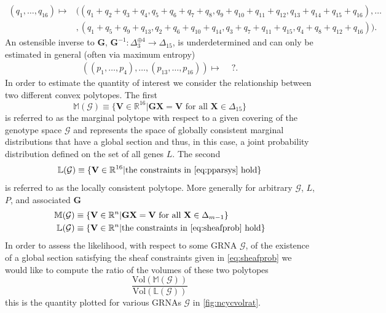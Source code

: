 \begin{align*}
(q_1, \ldots , q_{16}) \mapsto &((q_1+q_2+q_3+q_4, q_5+q_6+q_7+q_8, q_9+q_{10}+q_{11}+q_{12},q_{13}+q_{14}+q_{15}+q_{16}), \ldots \\
&,(q_1 + q_5 + q_9 + q_{13}, q_2 + q_6 + q_{10} + q_{14}, q_3 + q_7 + q_{11} + q_{15}, q_4 + q_8 + q_{12} + q_{16} ) ).
\end{align*}
An ostensible inverse to $\mathbf{G}$, $\mathbf{G}^{-1} \colon \Delta_3^{\oplus 4} \longrightarrow \Delta_{15}$, is underdetermined and can only be estimated in general (often via maximum entropy)
\begin{align*}
((p_1, \ldots , p_4), \ldots, (p_{13},\ldots,p_{16})) \mapsto & \,\,?.
\end{align*}
In order to estimate the quantity of interest we consider the relationship between two different convex polytopes. The first
$$
\mathbb{M}(\mathcal{G}) \equiv \{\mathbf{V} \in \mathbb{R}^{16} | \mathbf{G}\mathbf{X}=\mathbf{V} \text{ for all } \mathbf{X} \in \Delta_{15}\}
$$
is referred to as the marginal polytope with respect to a given covering of the genotype space $\mathcal{G}$ and represents the space of globally consistent marginal distributions that have a global section and thus, in this case, a joint probability distribution defined on the set of all genes $L$. The second
$$
\mathbb{L}(\mathcal{G}) \equiv \{\mathbf{V} \in \mathbb{R}^{16} | \text{the constraints in \ref{eq:pparsys} hold}\}
$$
is referred to as the locally consistent polytope. More generally for arbitrary $\mathcal{G}$, $L$, $P$, and associated $\mathbf{G}$
\begin{equation}
\begin{aligned}\label{eq:polytopes}
\mathbb{M}(\mathcal{G}) &\equiv \{\mathbf{V} \in \mathbb{R}^{n} | \mathbf{G}\mathbf{X}=\mathbf{V} \text{ for all } \mathbf{X} \in \Delta_{m-1}\}\\
\mathbb{L}(\mathcal{G}) &\equiv \{\mathbf{V} \in \mathbb{R}^{n} | \text{the constraints in \ref{eq:sheafprob} hold}\}
\end{aligned}
\end{equation}
In order to assess the likelihood, with respect to some GRNA $\mathcal{G}$, of the existence of a global section satisfying the sheaf constraints given in \ref{eq:sheafprob} we would like to compute the ratio of the volumes of these two polytopes
\begin{equation}\label{eq:volrat}
\frac{\text{Vol}(\mathbb{M}(\mathcal{G}))}{\text{Vol}(\mathbb{L}(\mathcal{G}))}
\end{equation}
this is the quantity plotted for various GRNAs $\mathcal{G}$ in \ref{fig:ncycvolrat}.

